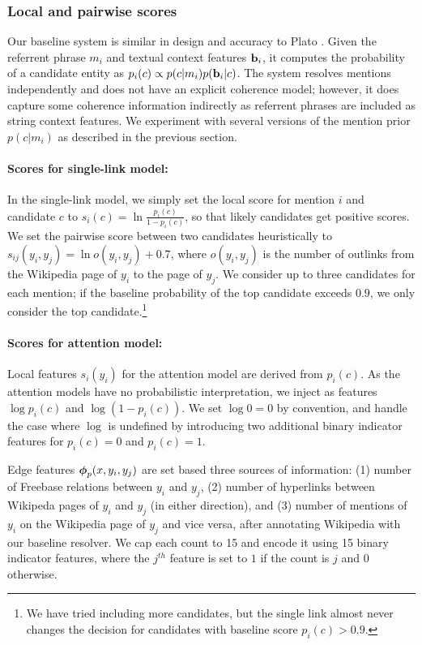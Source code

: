 \subsubsection{Local and pairwise scores}
\label{sec:expt:features}

Our baseline system is similar in design and accuracy to Plato \cite{Lazic2015}.
Given the referrent phrase $m_i$ and textual context features ${\bf b}_i$, it computes
the probability of a candidate entity as $p_i(c) \propto p(c|m_i)p({\bf b}_i|c)$. 
The system resolves mentions independently and does not have an explicit coherence model;
however, it does capture some coherence information indirectly as referrent phrases are
included as string context features. We experiment with several versions of the
mention prior $p(c|m_i)$ as described in the previous section.


\paragraph*{Scores for single-link model:}
In the single-link model, we simply set the local score for
mention $i$ and candidate $c$ to $s_i(c) = \ln \frac{p_i(c )}{1 -
p_i(c)}$, so that likely candidates get positive
scores.  We set the pairwise score between two candidates heuristically to
$s_{ij}(y_i, y_j) = \ln o(y_i, y_j) + 0.7$, where $o(y_i, y_j)$ is the number of
outlinks from the Wikipedia page of $y_i$ to the page of $y_j$.  We
consider up to three candidates for each mention; if the baseline
probability of the top candidate exceeds $0.9$, we only consider the top
candidate.\footnote{We have tried including more candidates, but the single link
almost never changes the decision for candidates with baseline score $p_i(c)>0.9$.}

\paragraph*{Scores for attention model:}
{Local features} $s_i(y_i)$ for the attention model are derived
from $p_i(c)$.  As the attention models have no probabilistic
interpretation, we inject as features
$\log p_i(c)$ and $\log(1-p_i(c))$. We set $\log0=0$ by convention,
and handle the case where $\log$ is undefined by introducing two additional
binary indicator features for $p_i(c)=0$ and $p_i(c)=1$.

{Edge features} $\boldsymbol{\phi}_p(x,y_i,y_j)$ are set based three sources of information: (1) number of Freebase relations between $y_i$ and $y_j$, (2) number of hyperlinks between Wikipeda pages of $y_i$ and $y_j$ (in either direction), and
(3) number of mentions of $y_i$ on the Wikipedia page of $y_j$ and vice versa, after
annotating  Wikipedia with our baseline resolver. 
We cap each count to 15 and encode it using 15 binary indicator features,
where the $j^{th}$ feature is set to $1$ if the count is $j$ and $0$ otherwise.

